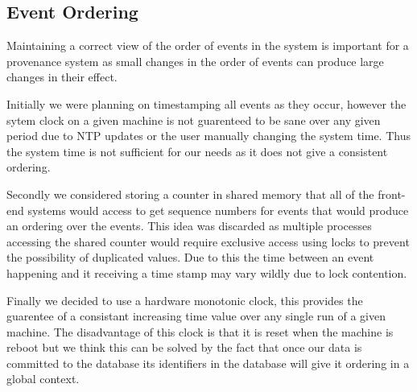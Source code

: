\subsection{Event Ordering}
Maintaining a correct view of the order of events in the system is important for a provenance system as small changes in the order of events can produce large changes in their effect.

Initially we were planning on timestamping all events as they occur, however the sytem clock on a given machine is not guarenteed to be sane over any given period due to NTP updates or the user manually changing the system time. Thus the system time is not sufficient for our needs as it does not give a consistent ordering.

Secondly we considered storing a counter in shared memory that all of the front-end systems would access to get sequence numbers for events that would produce an ordering over the events. This idea was discarded as multiple processes accessing the shared counter would require exclusive access using locks to prevent the possibility of duplicated values. Due to this the time between an event happening and it receiving a time stamp may vary wildly due to lock contention.

Finally we decided to use a hardware monotonic clock, this provides the guarentee of a consistant increasing time value over any single run of a given machine. The disadvantage of this clock is that it is reset when the machine is reboot but we think this can be solved by the fact that once our data is committed to the database its identifiers in the database will give it ordering in a global context.
